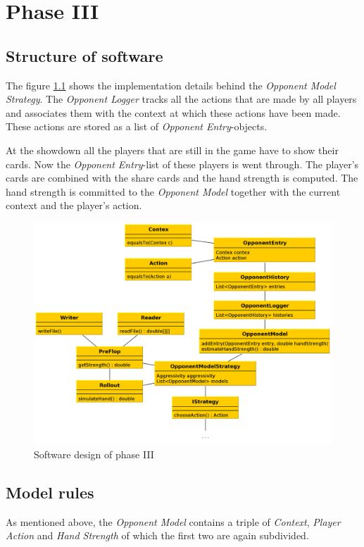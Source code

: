 \chapter{Phase III}

\section{Structure of software}
The figure \ref{fig:phase3} shows the implementation details behind the \emph{Opponent Model Strategy}. The \emph{Opponent Logger} tracks all the actions that are made by all players and associates them with the context at which these actions have been made. These actions are stored as a list of \emph{Opponent Entry}-objects. 

At the showdown all the players that are still in the game have to show their cards. Now the \emph{Opponent Entry}-list of these players is went through. The player's cards are combined with the share cards and the hand strength is computed. The hand strength is committed to the \emph{Opponent Model} together with the current context and the player's action.

\begin{figure}[h]
  \centering
  \includegraphics[width=1.0\textwidth]{images/phase3}
  \caption{Software design of phase III}
  \label{fig:phase3}
\end{figure}

\section{Model rules}
As mentioned above, the \emph{Opponent Model} contains  a triple of \emph{Context}, \emph{Player Action} and \emph{Hand Strength} of which the first two are again subdivided.

